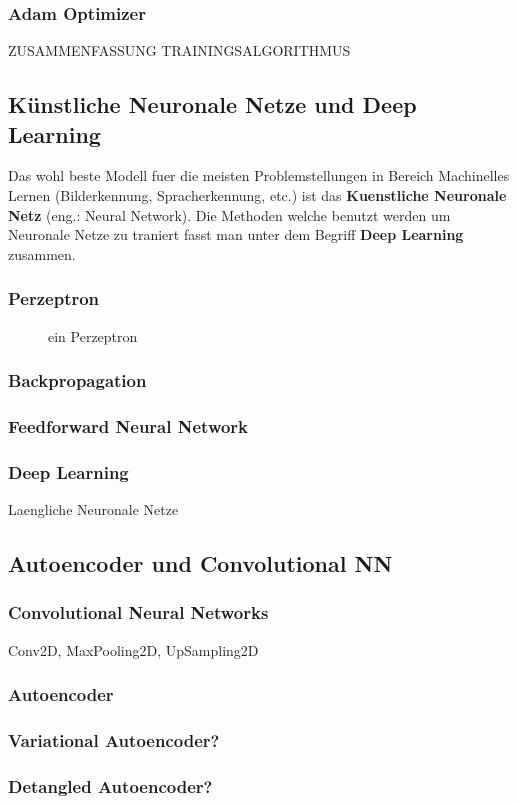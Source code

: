 \documentclass[../main]{subfiles}
\begin{document}
\subsubsection{Adam Optimizer}
ZUSAMMENFASSUNG TRAININGSALGORITHMUS

\subsection{Künstliche Neuronale Netze und Deep Learning}
Das wohl beste Modell fuer die meisten Problemstellungen in Bereich Machinelles Lernen (Bilderkennung, Spracherkennung, etc.) ist das \textbf{Kuenstliche Neuronale Netz} (eng.: Neural Network).
Die Methoden welche benutzt werden um Neuronale Netze zu traniert fasst man unter dem Begriff \textbf{Deep Learning} zusammen.

\subsubsection{Perzeptron}
\begin{figure}[h!]
    \centering
    \caption{ein Perzeptron}

\end{figure}

\subsubsection{Backpropagation}
\subsubsection{Feedforward Neural Network}
\subsubsection{Deep Learning}
Laengliche Neuronale Netze

\subsection{Autoencoder und Convolutional NN}
\subsubsection{Convolutional Neural Networks}
Conv2D, MaxPooling2D, UpSampling2D
\subsubsection{Autoencoder}
\subsubsection{Variational Autoencoder?}
\subsubsection{Detangled Autoencoder?}
\end{document}
